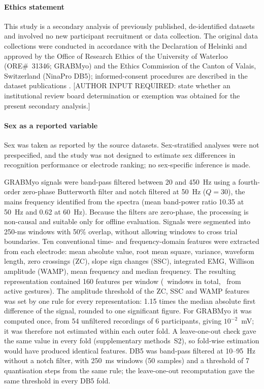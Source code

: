 \paragraph{Ethics statement} This study is a secondary analysis of previously published, de-identified datasets and involved no new participant recruitment or data collection. The original data collections were conducted in accordance with the Declaration of Helsinki and approved by the Office of Research Ethics of the University of Waterloo (ORE\#~31346; GRABMyo) and the Ethics Commission of the Canton of Valais, Switzerland (NinaPro DB5); informed-consent procedures are described in the dataset publications \citep{pradhan2022multiday,pizzolato2017comparison}. [AUTHOR INPUT REQUIRED: state whether an institutional review board determination or exemption was obtained for the present secondary analysis.]

\paragraph{Sex as a reported variable} Sex was taken as reported by the source datasets. Sex-stratified analyses were not prespecified, and the study was not designed to estimate sex differences in recognition performance or electrode ranking; no sex-specific inference is made.

GRABMyo signals were band-pass filtered between 20 and 450~Hz using a fourth-order zero-phase Butterworth filter and notch filtered at 50~Hz ($Q = 30$), the mains frequency identified from the spectra (mean band-power ratio 10.35 at 50~Hz and 0.62 at 60~Hz). Because the filters are zero-phase, the processing is non-causal and suitable only for offline evaluation. Signals were segmented into 250-ms windows with 50\% overlap, without allowing windows to cross trial boundaries. Ten conventional time- and frequency-domain features were extracted from each electrode: mean absolute value, root mean square, variance, waveform length, zero crossings (ZC), slope sign changes (SSC), integrated EMG, Willison amplitude (WAMP), mean frequency and median frequency. The resulting representation contained 160 features per window (\GRABMyoWindows\ windows in total, \GRABMyoActiveWindows\ from active gestures).  The amplitude threshold of the ZC, SSC and WAMP features was set by one rule for every representation: 1.15 times the median absolute first difference of the signal, rounded to one significant figure. For GRABMyo it was computed once, from 54 unfiltered recordings of 6 participants, giving $10^{-2}$~mV; it was therefore not estimated within each outer fold. A leave-one-out check gave the same value in every fold (supplementary methods~S2), so fold-wise estimation would have produced identical features. DB5 was band-pass filtered at 10--95~Hz without a notch filter, with 250~ms windows (50 samples) and a threshold of 7 quantisation steps from the same rule; the leave-one-out recomputation gave the same threshold in every DB5 fold.

